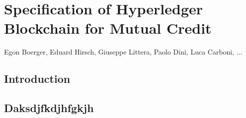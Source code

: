 \chapter{Specification of Hyperledger Blockchain for Mutual Credit}
\label{ch:bchain}

\vspace{-1cm}
\begin{center}
Egon Boerger, Eduard Hirsch, Giuseppe Littera, Paolo Dini, Luca Carboni, ...
\end{center}

\section{Introduction}


\section{Daksdjfkdjhfgkjh}



























